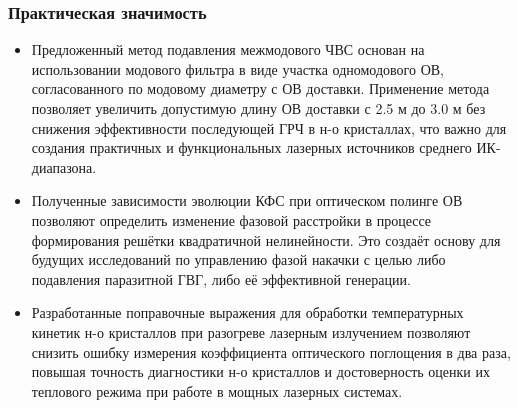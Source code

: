 \begin{frame}
    \frametitle{Практическая значимость}
    \begin{itemize}
    	\setlength{\itemsep}{0.4em}
        \item Предложенный метод подавления межмодового ЧВС основан на использовании модового фильтра в виде участка одномодового ОВ, согласованного по модовому диаметру с ОВ доставки. Применение метода позволяет увеличить допустимую длину ОВ доставки с 2.5 м до 3.0 м без снижения эффективности последующей ГРЧ в н-о кристаллах, что важно для создания практичных и функциональных лазерных источников среднего ИК-диапазона.
        
        \item Полученные зависимости эволюции КФС при оптическом полинге ОВ позволяют определить изменение фазовой расстройки в процессе формирования решётки квадратичной нелинейности. Это создаёт основу для будущих исследований по управлению фазой накачки с целью либо подавления паразитной ГВГ, либо её эффективной генерации.
        
        \item Разработанные поправочные выражения для обработки температурных кинетик н-о кристаллов при разогреве лазерным излучением позволяют снизить ошибку измерения коэффициента оптического поглощения в два раза, повышая точность диагностики н-о кристаллов и достоверность оценки их теплового режима при работе в мощных лазерных системах.
    \end{itemize}
\end{frame}


